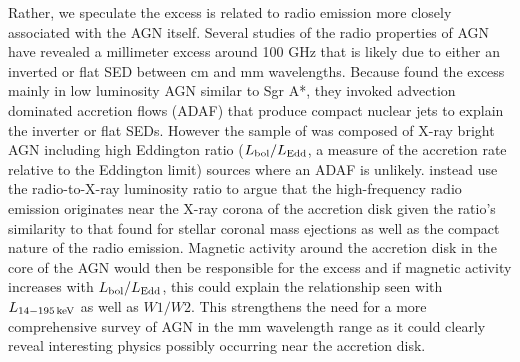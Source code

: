 Rather, we speculate the excess is related to radio emission more closely associated with the AGN itself. Several studies of the radio properties of AGN have revealed a millimeter excess around 100 GHz \citep{Doi:2005wj,Doi:2011si,Behar:2015le,Scharwachter:2015ez} that is likely due to either an inverted or flat SED between cm and mm wavelengths. Because \citet{Doi:2011si} found the excess mainly in low luminosity AGN similar to Sgr A*, they invoked advection dominated accretion flows (ADAF) that produce compact nuclear jets to explain the inverter or flat SEDs. However the sample of \citet{Behar:2015le} was composed of X-ray bright AGN including high Eddington ratio ($L_{\rm bol}/L_{\rm Edd}$, a measure of the accretion rate relative to the Eddington limit) sources where an ADAF is unlikely. \citet{Behar:2015le} instead use the radio-to-X-ray luminosity ratio to argue that the high-frequency radio emission originates near the X-ray corona of the accretion disk given the ratio's similarity to that found for stellar coronal mass ejections \citep[e.g][]{Bastian:1998tx} as well as the compact nature of the radio emission. Magnetic activity around the accretion disk in the core of the AGN would then be responsible for the excess and if magnetic activity increases with $L_{\rm bol}/L_{\rm Edd}$, this could explain the relationship seen with $L_{\rm 14-195\,keV}$ as well as $W1/W2$. This strengthens the need for a more comprehensive survey of AGN in the mm wavelength range as it could clearly reveal interesting physics possibly occurring near the accretion disk.
  
  
  
  